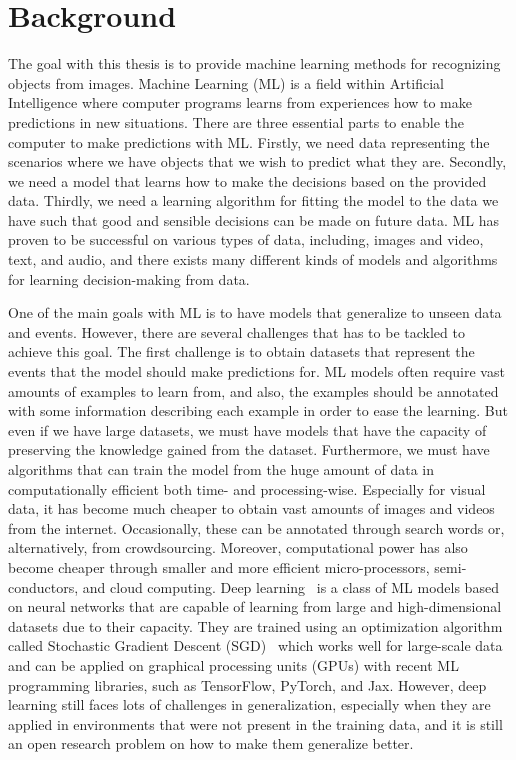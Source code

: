 
\chapter{Background}
\label{chap:background}

The goal with this thesis is to provide machine learning methods for recognizing objects from images. Machine Learning (ML) is a field within Artificial Intelligence where computer programs learns from experiences how to make predictions in new situations. There are three essential parts to enable the computer to make predictions with ML. Firstly, we need data representing the scenarios where we have objects that we wish to predict what they are. Secondly, we need a model that learns how to make the decisions based on the provided data. Thirdly, we need a learning algorithm for fitting the model to the data we have such that good and sensible decisions can be made on future data. ML has proven to be successful on various types of data, including, images and video, text, and audio, and there exists many different kinds of models and algorithms for learning decision-making from data. 

One of the main goals with ML is to have models that generalize to unseen data and events. However, there are several challenges that has to be tackled to achieve this goal. The first challenge is to obtain datasets that represent the events that the model should make predictions for. ML models often require vast amounts of examples to learn from, and also, the examples should be annotated with some information describing each example in order to ease the learning. But even if we have large datasets, we must have models that have the capacity of preserving the knowledge gained from the dataset. Furthermore, we must have algorithms that can train the model from the huge amount of data in computationally efficient both time- and processing-wise. Especially for visual data, it has become much cheaper to obtain vast amounts of images and videos from the internet. Occasionally, these can be annotated through search words or, alternatively, from crowdsourcing. Moreover, computational power has also become cheaper through smaller and more efficient micro-processors, semi-conductors, and cloud computing. Deep learning~\cite{goodfellow2016deep} is a class of ML models based on neural networks that are capable of learning from large and high-dimensional datasets due to their capacity. They are trained using an optimization algorithm called Stochastic Gradient Descent (SGD)~\cite{bottou2010large} which works well for large-scale data and can be applied on graphical processing units (GPUs) with recent ML programming libraries, such as TensorFlow, PyTorch, and Jax. However, deep learning still faces lots of challenges in generalization, especially when they are applied in environments that were not present in the training data, and it is still an open research problem on how to make them generalize better. 


